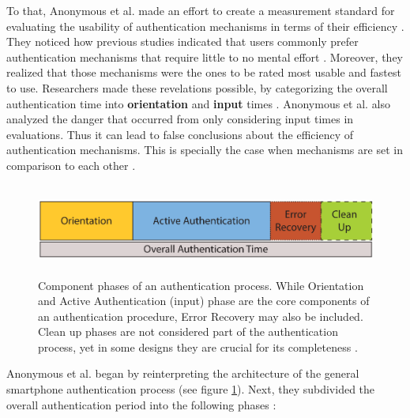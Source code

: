 To that, Anonymous et al. \cite{anonymous} made an effort to create a measurement standard for evaluating the usability of authentication mechanisms in terms of their efficiency \cite{anonymous}. They noticed how previous studies indicated that users commonly prefer authentication mechanisms that require little to no mental effort \cite{anonymous, AnatomySmartphone}. Moreover, they realized that those mechanisms were the ones to be rated most usable and fastest to use. Researchers made these revelations possible, by categorizing the overall authentication time into \textbf{orientation} and \textbf{input} times \cite{anonymous}. Anonymous et al. \cite{anonymous} also analyzed the danger that occurred from only considering input times in evaluations. Thus it can lead to false conclusions about the efficiency of authentication mechanisms. This is specially the case when mechanisms are set in comparison to each other \cite{anonymous}. \\

\begin{figure}[t!]
\centering
\includegraphics[width=15cm, height=3cm]{Chapters/graphics/Phases.PNG}
\caption{Component phases of an authentication process. While Orientation and Active Authentication (input) phase are the core components of an authentication procedure, Error Recovery may also be included. Clean up phases are not considered part of the authentication process, yet in some designs they are crucial for its completeness \cite{anonymous}. }
\label{fig:phases}
\end{figure}

Anonymous et al. \cite{anonymous} began by reinterpreting the architecture of the general smartphone authentication process (see figure \ref{fig:phases}). Next, they subdivided the overall authentication period into the following phases \cite{anonymous}: 


